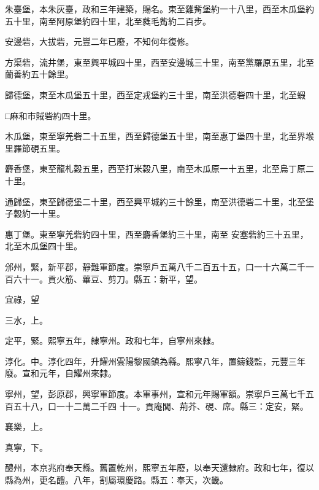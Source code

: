 \begin{pinyinscope}
 朱臺堡，本朱灰臺，政和三年建築，賜名。東至雞觜堡約一十八里，西至木瓜堡約五十里，南至阿原堡約四十里，北至蕤毛觜約二百步。



 安邊砦，大拔砦，元豐二年已廢，不知何年復修。



 方渠砦，流井堡，東至興平城四十里，西至安邊城三十里，南至黨羅原五里，北至蘭善約五十餘里。



 歸德堡，東至木瓜堡五十里，西至定戎堡約三十里，南至洪德砦四十里，北至蝦



 □麻和市賊砦約四十里。



 木瓜堡，東至寧羌砦二十五里，西至歸德堡五十里，南至惠丁堡四十里，北至界堠里羅節硯五里。



 麝香堡，東至龍札穀五里，西至打米穀八里，南至木瓜原一十五里，北至烏丁原二十里。



 通歸堡，東至歸德堡二十里，西至興平城約三十餘里，南至洪德砦二十里，北至堡子穀約一十里。



 惠丁堡。東至寧羌砦約四十里，西至麝香堡約三十里，南至
 安塞砦約三十五里，北至木瓜堡四十里。



 邠州，緊，新平郡，靜難軍節度。崇寧戶五萬八千二百五十五，口一十六萬二千一百六十一。貢火筋、蓽豆、剪刀。縣五：新平，望。



 宜祿，望



 三水，上。



 定平，緊。熙寧五年，隸寧州。政和七年，自寧州來隸。



 淳化。中。淳化四年，升耀州雲陽黎國鎮為縣。熙寧八年，置鑄錢監，元豐三年廢。宣和元年，自耀州來隸。



 寧州，望，彭原郡，興寧軍節度。本軍事州，宣和元年賜軍額。崇寧戶三萬七千五百五十八，口一十二萬二千四
 十一。貢庵閭、荊芥、硯、席。縣三：定安，緊。



 襄樂，上。



 真寧，下。



 醴州，本京兆府奉天縣。舊置乾州，熙寧五年廢，以奉天還隸府。政和七年，復以縣為州，更名醴。八年，割屬環慶路。縣五：奉天，次畿。




\end{pinyinscope}
